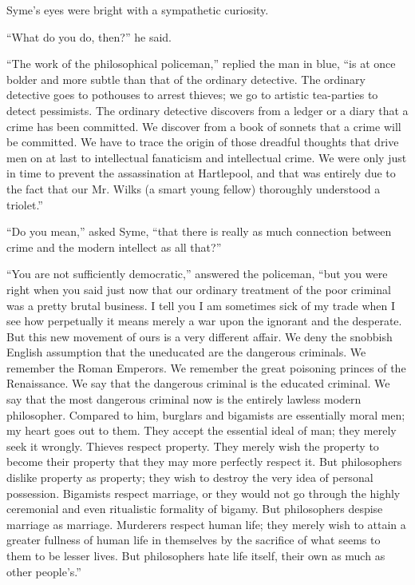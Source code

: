 Syme’s eyes were bright with a sympathetic curiosity.

“What do you do, then?” he said.

“The work of the philosophical policeman,” replied the man in blue, “is at once bolder and more subtle than that of the ordinary detective. The ordinary detective goes to pothouses to arrest thieves; we go to artistic tea-parties to detect pessimists. The ordinary detective discovers from a ledger or a diary that a crime has been committed. We discover from a book of sonnets that a crime will be committed. We have to trace the origin of those dreadful thoughts that drive men on at last to intellectual fanaticism and intellectual crime. We were only just in time to prevent the assassination at Hartlepool, and that was entirely due to the fact that our Mr. Wilks (a smart young fellow) thoroughly understood a triolet.”

“Do you mean,” asked Syme, “that there is really as much connection between crime and the modern intellect as all that?”

“You are not sufficiently democratic,” answered the policeman, “but you were right when you said just now that our ordinary treatment of the poor criminal was a pretty brutal business. I tell you I am sometimes sick of my trade when I see how perpetually it means merely a war upon the ignorant and the desperate. But this new movement of ours is a very different affair. We deny the snobbish English assumption that the uneducated are the dangerous criminals. We remember the Roman Emperors. We remember the great poisoning princes of the Renaissance. We say that the dangerous criminal is the educated criminal. We say that the most dangerous criminal now is the entirely lawless modern philosopher. Compared to him, burglars and bigamists are essentially moral men; my heart goes out to them. They accept the essential ideal of man; they merely seek it wrongly. Thieves respect property. They merely wish the property to become their property that they may more perfectly respect it. But philosophers dislike property as property; they wish to destroy the very idea of personal possession. Bigamists respect marriage, or they would not go through the highly ceremonial and even ritualistic formality of bigamy. But philosophers despise marriage as marriage. Murderers respect human life; they merely wish to attain a greater fullness of human life in themselves by the sacrifice of what seems to them to be lesser lives. But philosophers hate life itself, their own as much as other people’s.”

